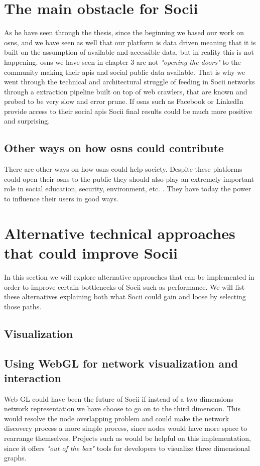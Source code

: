 \section{The main obstacle for Socii}
As he have seen through the thesis, since the beginning we based our work on \glspl{osn}, and we have seen as well that our platform is data driven meaning that it is built on the assumption of available and accessible data, but in reality this is not happening. \glspl{osn} we have seen in chapter 3 are not \textit{"opening the doors"} to the community making their \glspl{api} and social public data available. That is why we went through the technical and architectural struggle of feeding in Socii networks through a extraction pipeline built on top of web crawlers, that are known and probed to be very slow and error prune. If \glspl{osn} such as Facebook or LinkedIn provide access to their social \glspl{api} Socii final results could be much more positive and surprising.

\subsection*{Other ways on how \glspl{osn} could contribute}
There are other ways on how \glspl{osn} could help society. Despite these platforms could open their \glspl{osn} to the public they should also play an extremely important role in social education, security, environment, etc. . They have today the power to influence their users in good ways.

\section{Alternative technical approaches that could improve Socii}
In this section we will explore alternative approaches that can be implemented in order to improve certain bottlenecks of Socii such as performance. We will list these alternatives explaining both what Socii could gain and loose by selecting those paths.

\subsection{Visualization}

\subsection*{Using WebGL for network visualization and interaction}
Web GL \citep{marrin2011webgl} could have been the future of Socii if instead of a two dimensions network representation we have choose to go on to the third dimension. This would resolve the node overlapping problem and could make the network discovery process a more simple process, since nodes would have more space to rearrange themselves.  Projects such as \citep{graphosaurus} would be helpful on this implementation, since it offers \textit{"out of the box"} tools for developers to visualize three dimensional graphs.

